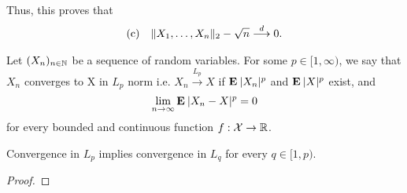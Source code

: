 Thus, this proves that
\[ \everymath{\displaystyle}
\begin{array}{cc}
    \text{(c)} & \|X_1, \ldots, X_n\|_2-\sqrt{n} \overset{d}{\longrightarrow} 0.
\end{array} \]

\begin{definition}[Convergence in $L_p$]
    Let $(X_n)_{n\in \mathbb{N}}$ be a sequence of random variables. For some $p \in [1,\infty)$, we say that $X_n$ converges to X in $L_p$ norm i.e. $X_n \overset{L_p}{\to} X$ if $\mathbf{E}\: |X_n|^p$ and $\mathbf{E}\: |X|^p$ exist, and
    \[ \lim_{n\to\infty} \mathbf{E}\: |X_n - X|^p = 0\]
    for every bounded and continuous function $f : \mathcal{X}\to \mathbb{R}$.
\end{definition}

\begin{theorem}[Exercise 1.d.]
Convergence in $L_p$ implies convergence in $L_q$ for every $q\in [1,p)$.
\end{theorem}
\begin{proof}

\end{proof}